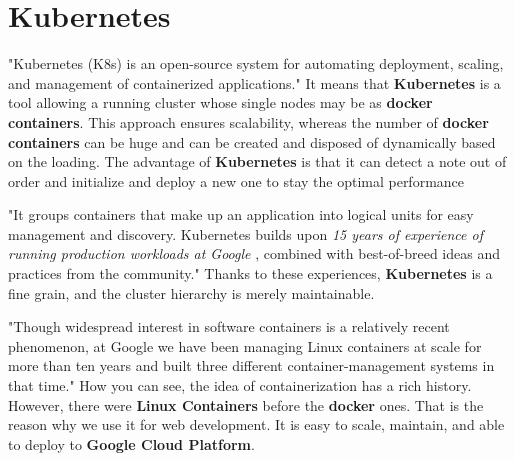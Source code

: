 \section{Kubernetes}\label{sec:kubernetes}
"Kubernetes (K8s) is an open-source system for automating deployment, scaling, and management of containerized applications."\cite{kubernetes}
It means that \textbf{Kubernetes} is a tool allowing a running cluster whose single nodes may be as \textbf{docker containers}.
This approach ensures scalability, whereas the number of \textbf{docker containers} can be huge and can be created and disposed of dynamically based on the loading.
The advantage of \textbf{Kubernetes} is that it can detect a note out of order and initialize and deploy a new one to stay the optimal performance

"It groups containers that make up an application into logical units for easy management and discovery.
Kubernetes builds upon \textit{15 years of experience of running production workloads at Google} \cite{kubernetesArticle}, combined with best-of-breed ideas and practices from the community."\cite{kubernetes}
Thanks to these experiences, \textbf{Kubernetes} is a fine grain, and the cluster hierarchy is merely maintainable.

"Though widespread interest in software containers is a relatively recent phenomenon, at Google we have been managing Linux containers at scale for more than ten years and built three different container-management systems in that time."\cite{kubernetesArticle}
How you can see, the idea of containerization has a rich history.
However, there were \textbf{Linux Containers} before the \textbf{docker} ones.
That is the reason why we use it for web development.
It is easy to scale, maintain, and able to deploy to \textbf{Google Cloud Platform}.